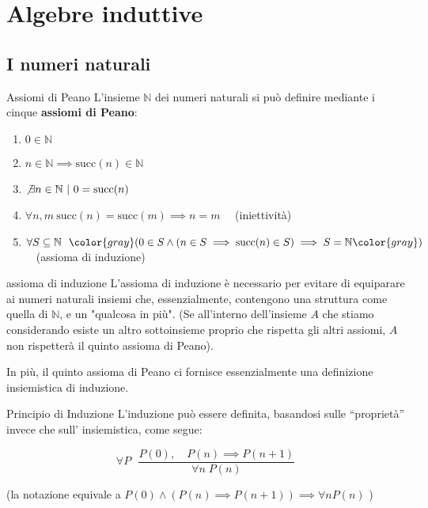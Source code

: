\documentclass[a4paper,11pt]{report}
\begin{document}
\makefrontpage

\tableofcontents

\chapter{Algebre induttive}

\section{I numeri naturali}

\begin{defbox}{Assiomi di Peano}{}
    L'insieme \(\mathbb{N}\) dei numeri naturali si può definire mediante i cinque \textbf{assiomi di Peano}:
    \begin{enumerate}
        \item \( 0 \in \mathbb{N} \)
        \item \( n \in  \mathbb{N} \implies \text{succ}(n) \in \mathbb{N} \)
        \item \( \not\exists n \in \mathbb{N} \ | \ 0 = \text{succ}(n) \)
        \item \( \forall n, m \ \text{succ}(n) = \text{succ}(m) \implies n = m \) \ \  {\color{gray}\small (iniettività)}
        \item \( \forall S \subseteq \mathbb{N} \ \ {\color{gray}(}0 \in S \land (n \in S \implies \text{succ}(n)\in S) \implies S = \mathbb{N}{\color{gray})}\) \ \ {\color{gray}\small (assioma di induzione)}

    \end{enumerate} 

    \begin{gbox}{assioma di induzione}
        L'assioma di induzione è necessario per evitare di equiparare ai numeri naturali insiemi che, essenzialmente, contengono una struttura come quella di \( \mathbb{N} \), e un "qualcosa in più". (Se all'interno dell'insieme \( A \) che stiamo considerando esiste un altro sottoinsieme proprio che rispetta gli altri assiomi, \( A \) non rispetterà il quinto assioma di Peano). 

        In più, il quinto assioma di Peano ci fornisce essenzialmente una definizione insiemistica di induzione.
    \end{gbox}

\end{defbox}


\begin{defbox}{Principio di Induzione}{}
    L'induzione può essere definita, basandosi sulle ``proprietà'' invece che 
    sull' insiemistica, come segue:

    \[
        \forall P \ \ \ \frac{P(0), \quad P(n) \implies P(n+1)}{\forall n\; P(n)}
    \]

    (la notazione equivale a \( P(0) \land (P(n) \implies P(n+1))  \implies \forall n P(n) \) )

\end{defbox}
\end{document}

